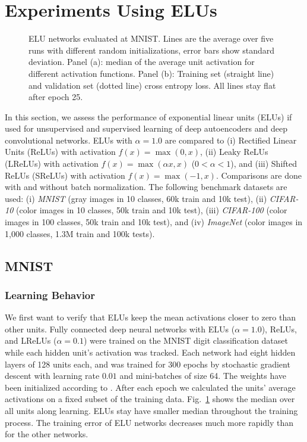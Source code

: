 \documentclass{article}
\begin{document}
\section{Experiments Using ELUs}
\label{sec:exp}
\begin{figure}[!ht]
\begin{center}
\end{center}
\caption{ELU networks evaluated at MNIST. Lines are
the average over five runs with different random initializations, error
bars show standard deviation.
Panel (a): median of the average unit activation for different
activation functions.
Panel (b): Training set (straight line) and validation set (dotted line)
 cross entropy loss. All lines stay flat after epoch 25.
\label{fig:mnistplots}}
\end{figure}

In this section, we assess the performance of exponential linear units (ELUs)
if used for unsupervised and supervised learning of deep autoencoders and
deep convolutional networks. ELUs with $\alpha=1.0$  are compared to
(i) Rectified Linear Units (ReLUs) with activation $f(x)=\max(0,x)$,
(ii) Leaky ReLUs (LReLUs) with activation $f(x)=\max(\alpha x,x)$ ($0<\alpha<1$), and
(iii) Shifted ReLUs (SReLUs) with activation $f(x)=\max(-1,x)$.
Comparisons are done with and without batch normalization.
The following benchmark datasets are used:
(i) {\em MNIST} (gray images in 10 classes, 60k train and 10k test),
(ii) {\em CIFAR-10} (color images in 10 classes, 50k train and 10k test),
(iii) {\em CIFAR-100} (color images in 100 classes, 50k train and 10k test), and
(iv) {\em ImageNet} (color images in 1,000 classes, 1.3M train and 100k tests).


\subsection{MNIST}

\subsubsection{Learning Behavior}
We first want to verify that ELUs keep the mean activations closer to
zero than other units. Fully connected deep neural networks
with ELUs ($\alpha=1.0$), ReLUs, and LReLUs ($\alpha=0.1$) were
trained on the MNIST digit classification
dataset while each hidden unit's activation was tracked.
Each network had eight hidden layers of 128 units each, and was trained
for 300 epochs by
stochastic gradient descent with
learning rate $0.01$ and mini-batches of size 64.
The weights have been initialized according to \citep{He:15}.
After each epoch we calculated the units' average activations on a fixed
subset of the training data.
Fig.~\ref{fig:mnistplots} shows the median over all units along learning.
ELUs stay have smaller median throughout the training process.
The training error of ELU networks decreases much more rapidly than for the other
networks.
\end{document}

